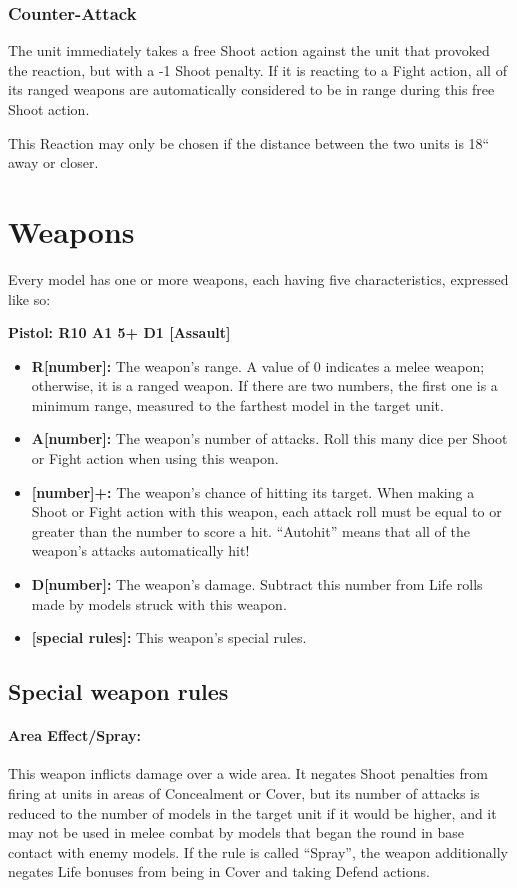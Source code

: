 \begin{multicols}{2}
\subsection*{Counter-Attack}
The unit immediately takes a free Shoot action against the unit that provoked the reaction, but with a -1 Shoot penalty. If it is reacting to a Fight action, all of its ranged weapons are automatically considered to be in range during this free Shoot action.

This Reaction may only be chosen if the distance between the two units is 18`` away or closer.




\chapter*{Weapons}

Every model has one or more weapons, each having five characteristics, expressed like so:

\textbf{Pistol: R10 A1 5+ D1 [Assault]}

\begin{itemize}
    \item \textbf{R[number]:} The weapon's range. A value of 0 indicates a melee weapon; otherwise, it is a ranged weapon. If there are two numbers, the first one is a minimum range, measured to the farthest model in the target unit.
    \item \textbf{A[number]:} The weapon's number of attacks. Roll this many dice per Shoot or Fight action when using this weapon.
    \item \textbf{[number]+:} The weapon's chance of hitting its target. When making a Shoot or Fight action with this weapon, each attack roll must be equal to or greater than the number to score a hit. ``Autohit'' means that all of the weapon's attacks automatically hit!
    \item \textbf{D[number]:} The weapon's damage. Subtract this number from Life rolls made by models struck with this weapon.
    \item \textbf{[special rules]:} This weapon's special rules.
\end{itemize}




\section*{Special weapon rules}

\subsubsection*{Area Effect/Spray:} This weapon inflicts damage over a wide area. It negates Shoot penalties from firing at units in areas of Concealment or Cover, but its number of attacks is reduced to the number of models in the target unit if it would be higher, and it may not be used in melee combat by models that began the round in base contact with enemy models. If the rule is called ``Spray'', the weapon additionally negates Life bonuses from being in Cover and taking Defend actions.


\end{multicols}
